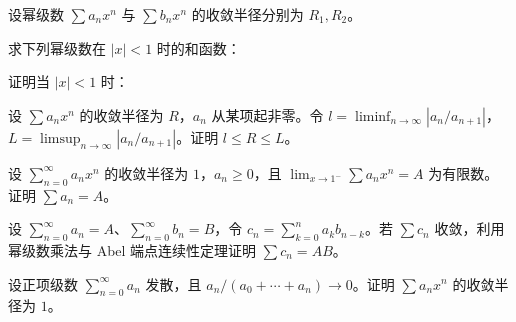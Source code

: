 \noindent\begin{minipage}{\textwidth}
设幂级数 $\sum a_nx^n$ 与 $\sum b_nx^n$ 的收敛半径分别为 $R_1,R_2$。
\end{minipage}\par\vfill
\newpage
\noindent\begin{minipage}{\textwidth}
求下列幂级数在 $|x|<1$ 时的和函数：
\end{minipage}\par\vfill
\noindent\begin{minipage}{\textwidth}
证明当 $|x|<1$ 时：
\end{minipage}\par\vfill
\noindent\begin{minipage}{\textwidth}
设 $\sum a_nx^n$ 的收敛半径为 $R$，$a_n$ 从某项起非零。令 $l=\liminf_{n\to\infty}|a_n/a_{n+1}|$，$L=\limsup_{n\to\infty}|a_n/a_{n+1}|$。证明 $l\le R\le L$。
\end{minipage}\par\vfill
\newpage
\noindent\begin{minipage}{\textwidth}
设 $\sum_{n=0}^{\infty}a_nx^n$ 的收敛半径为 $1$，$a_n\ge0$，且 $\lim_{x\to1^-}\sum a_nx^n=A$ 为有限数。证明 $\sum a_n=A$。
\end{minipage}\par\vfill
\noindent\begin{minipage}{\textwidth}
设 $\sum_{n=0}^{\infty}a_n=A$、$\sum_{n=0}^{\infty}b_n=B$，令 $c_n=\sum_{k=0}^na_kb_{n-k}$。若 $\sum c_n$ 收敛，利用幂级数乘法与 Abel 端点连续性定理证明 $\sum c_n=AB$。
\end{minipage}\par\vfill
\noindent\begin{minipage}{\textwidth}
设正项级数 $\sum_{n=0}^{\infty}a_n$ 发散，且 $a_n/(a_0+\cdots+a_n)\to0$。证明 $\sum a_nx^n$ 的收敛半径为 $1$。
\end{minipage}\par\vfill
